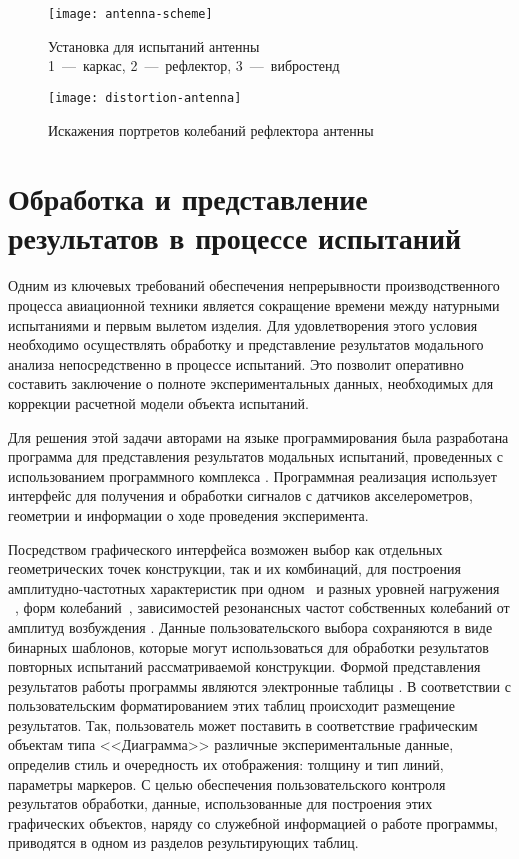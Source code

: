 \begin{figure}[H]
	\centerfloat
	\texttt{[image: antenna-scheme]}
	\caption{Установка для испытаний антенны \\ 1~---~каркас, 2~---~рефлектор, 3~---~вибростенд} \label{fig:antenna-scheme}
\end{figure}

\begin{figure}[!htb]
	\centerfloat
	\texttt{[image: distortion-antenna]}
	\caption{Искажения портретов колебаний рефлектора антенны} \label{fig:distortion-antenna}
\end{figure}

\section{Обработка и представление результатов в процессе испытаний}

Одним из ключевых требований обеспечения непрерывности производственного процесса авиационной техники является сокращение времени между натурными испытаниями и первым вылетом изделия. Для удовлетворения этого условия необходимо осуществлять обработку и представление результатов модального анализа непосредственно в процессе испытаний. Это позволит оперативно составить заключение о полноте экспериментальных данных, необходимых для коррекции расчетной модели объекта испытаний. 

Для решения этой задачи авторами на языке программирования  была разработана программа  для представления результатов модальных испытаний, проведенных с использованием программного комплекса . Программная реализация использует интерфейс  для получения и обработки сигналов с датчиков акселерометров, геометрии и информации о ходе проведения эксперимента.

Посредством графического интерфейса  возможен выбор как отдельных геометрических точек конструкции, так и их комбинаций, для построения амплитудно-частотных характеристик при одном~ и разных уровней нагружения ~, форм колебаний~, зависимостей резонансных частот собственных колебаний от амплитуд возбуждения . Данные пользовательского выбора сохраняются в виде бинарных шаблонов, которые могут использоваться для обработки результатов повторных испытаний рассматриваемой конструкции. Формой представления результатов работы программы являются электронные таблицы . В соответствии с пользовательским форматированием этих таблиц происходит размещение результатов. Так, пользователь может поставить в соответствие графическим объектам типа <<Диаграмма>> различные экспериментальные данные, определив стиль и очередность их отображения: толщину и тип линий, параметры маркеров. С целью обеспечения пользовательского контроля результатов обработки, данные, использованные для построения этих графических объектов, наряду со служебной информацией о работе программы, приводятся в одном из разделов результирующих таблиц.

